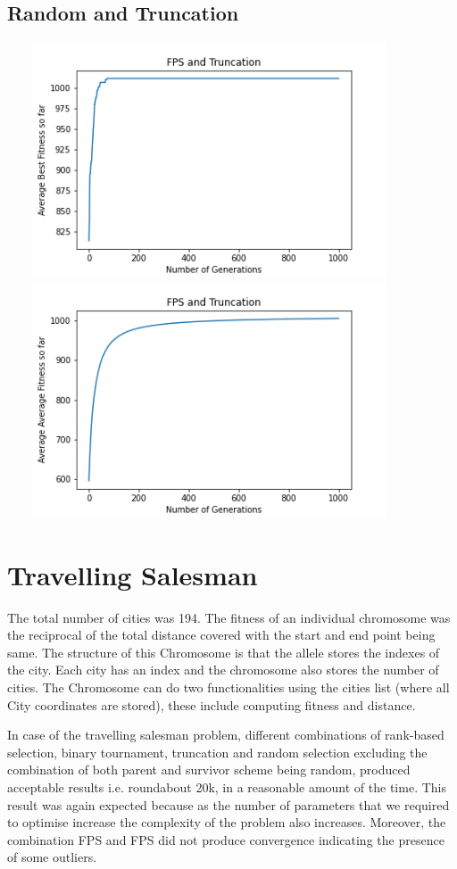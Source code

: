 \documentclass[a4paper]{article}
\begin{document}
\subsection{Random and Truncation}
\includegraphics[width=12cm, height=7cm]{Graphs/KnapSack/fps_trunc_bsf.png} \\
\includegraphics[width=12cm, height=7cm]{Graphs/KnapSack/fps_trunc_avg.png} \\


\section{Travelling Salesman}
The total number of cities was 194. The fitness of an individual chromosome was the reciprocal of the total distance covered with the start and end point being same. 
The structure of this Chromosome is that the allele stores the indexes of the city. Each city has an index and the chromosome also stores the number of cities.
The Chromosome can do two functionalities using the cities list (where all City coordinates are stored), these include computing fitness and distance.



In case of the travelling salesman problem, different combinations of rank-based selection, binary tournament, truncation and random selection excluding the combination of both parent and survivor scheme being random, produced acceptable results i.e. roundabout 20k, in a reasonable amount of the time.
This result was again expected because as the number of parameters that we required to optimise increase the complexity of the problem also increases. Moreover, the combination FPS and FPS did not produce convergence indicating the presence of some outliers. \newline
\end{document}
